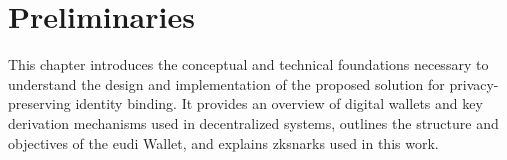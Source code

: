 \chapter{Preliminaries}
\label{chap:preliminaries}
This chapter introduces the conceptual and technical foundations necessary to understand the design and implementation of the proposed solution for privacy-preserving identity binding. It provides an overview of digital wallets and key derivation mechanisms used in decentralized systems, outlines the structure and objectives of the \acrshort{eudi} Wallet, and explains \acrshort{zksnark}s used in this work.




